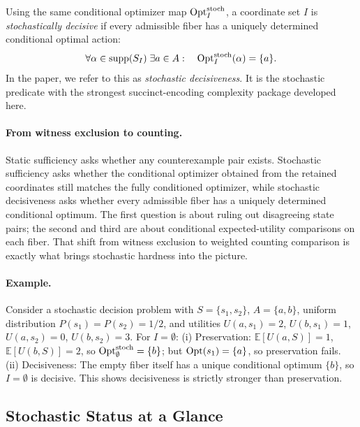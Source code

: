 \begin{definition}\label{def:stochastic-singleton-sufficient}
Using the same conditional optimizer map $\mathrm{Opt}^{\mathrm{stoch}}_I$, a coordinate set $I$ is \emph{stochastically decisive} if every admissible fiber has a uniquely determined conditional optimal action:
\[
\forall \alpha \in \mathrm{supp}(S_I)\; \exists a \in A:\quad \mathrm{Opt}^{\mathrm{stoch}}_I(\alpha)=\{a\}.
\]
In the paper, we refer to this as \emph{stochastic decisiveness}. It is the stochastic predicate with the strongest succinct-encoding complexity package developed here.
\end{definition}

\paragraph{From witness exclusion to counting.}
Static sufficiency asks whether any counterexample pair exists. Stochastic sufficiency asks whether the conditional optimizer obtained from the retained coordinates still matches the fully conditioned optimizer, while stochastic decisiveness asks whether every admissible fiber has a uniquely determined conditional optimum. The first question is about ruling out disagreeing state pairs; the second and third are about conditional expected-utility comparisons on each fiber. That shift from witness exclusion to weighted counting comparison is exactly what brings stochastic hardness into the picture.

\paragraph{Example.}
Consider a stochastic decision problem with $S=\{s_1,s_2\}$, $A=\{a,b\}$, uniform distribution $P(s_1)=P(s_2)=1/2$, and utilities $U(a,s_1)=2$, $U(b,s_1)=1$, $U(a,s_2)=0$, $U(b,s_2)=3$. For $I=\emptyset$: (i) Preservation: $\mathbb{E}[U(a,S)]=1$, $\mathbb{E}[U(b,S)]=2$, so $\mathrm{Opt}^{\mathrm{stoch}}_\emptyset=\{b\}$; but $\mathrm{Opt}(s_1)=\{a\}$, so preservation fails. (ii) Decisiveness: The empty fiber itself has a unique conditional optimum $\{b\}$, so $I=\emptyset$ is decisive. This shows decisiveness is strictly stronger than preservation.

\subsection{Stochastic Status at a Glance}

